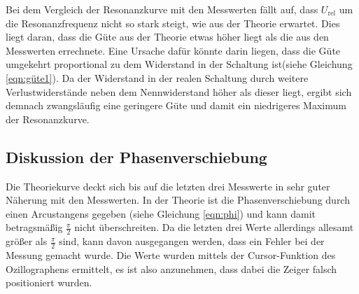 Bei dem Vergleich der Resonanzkurve mit den Messwerten fällt auf, dass
$U_\text{rel}$
um die Resonanzfrequenz nicht so stark steigt, wie aus der Theorie erwartet.
Dies liegt daran, dass die Güte aus der Theorie etwas höher liegt als die
aus den Messwerten errechnete. Eine Ursache dafür könnte darin liegen, dass
die Güte umgekehrt proportional zu dem Widerstand in der Schaltung ist(siehe
Gleichung \ref{eqn:güte1}).
Da der Widerstand in der realen Schaltung durch weitere Verlustwiderstände neben
dem Nennwiderstand höher als dieser liegt, ergibt sich demnach zwangsläufig
eine geringere Güte und damit ein niedrigeres Maximum der Resonanzkurve.


\subsection{Diskussion der Phasenverschiebung}
Die Theoriekurve deckt sich bis auf die letzten drei Messwerte in sehr guter
Näherung mit den Messwerten. In der Theorie ist die Phasenverschiebung
durch einen Arcustangens gegeben (siehe Gleichung \ref{eqn:phi}) und
kann damit betragsmäßig $\frac{\pi}{2}$ nicht überschreiten.
Da die letzten drei Werte allerdings allesamt größer als $\frac{\pi}{2}$ sind,
kann davon ausgegangen werden, dass ein Fehler bei der Messung gemacht wurde.
Die Werte wurden mittels der Cursor-Funktion des Ozillographens ermittelt, es
ist also anzunehmen, dass dabei die Zeiger falsch positioniert wurden.
